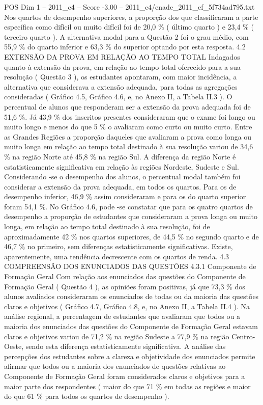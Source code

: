 \begin{textsample}{POS Dim 1 – 2011\_c4 – Score -3.00 – 2011\_c4/enade\_2011\_ef\_5f734ad795.txt}
Nos quartos de desempenho superiores, a proporção dos que classificaram a parte específica como difícil ou muito difícil foi de 20,0 \% ( último quarto ) e 23,4 \% ( terceiro quarto ).
A alternativa modal para a Questão 2 foi o grau médio, com 55,9 \% do quarto inferior e 63,3 \% do superior optando por esta resposta. 4.2 EXTENSÃO DA PROVA EM RELAÇÃO AO TEMPO TOTAL Indagados quanto à extensão da prova, em relação ao tempo total oferecido para a sua resolução ( Questão 3 ), os estudantes apontaram, com maior incidência, a alternativa que considerava a extensão adequada, para todas as agregações consideradas ( Gráfico 4.5, Gráfico 4.6, e, no Anexo II, a Tabela II.3 ).
O percentual de alunos que responderam ser a extensão da prova adequada foi de 51,6 \%.
Já 43,9 \% dos inscritos presentes consideraram que o exame foi longo ou muito longo e menos do que 5 \% o avaliaram como curto ou muito curto.
Entre as Grandes Regiões a proporção daqueles que avaliaram a prova como longa ou muito longa em relação ao tempo total destinado à sua resolução variou de 34,6 \% na região Norte até 45,8 \% na região Sul.
A diferença da região Norte é estatisticamente significativa em relação às regiões Nordeste, Sudeste e Sul.
Considerando -se o desempenho dos alunos, o percentual modal também foi considerar a extensão da prova adequada, em todos os quartos.
Para os de desempenho inferior, 46,9 \% assim consideraram e para os do quarto superior foram 54,1 \%.
No Gráfico 4.6, pode -se constatar que para os quatro quartos de desempenho a proporção de estudantes que consideraram a prova longa ou muito longa, em relação ao tempo total destinado à sua resolução, foi de aproximadamente 42 \% nos quartos superiores, de 44,5 \% no segundo quarto e de 46,7 \% no primeiro, sem diferenças estatisticamente significativas.
Existe, aparentemente, uma tendência decrescente com os quartos de renda. 4.3 COMPREENSÃO DOS ENUNCIADOS DAS QUESTÕES 4.3.1 Componente de Formação Geral Com relação aos enunciados das questões do Componente de Formação Geral ( Questão 4 ), as opiniões foram positivas, já que 73,3 \% dos alunos avaliados consideraram os enunciados de todas ou da maioria das questões claros e objetivos ( Gráfico 4.7, Gráfico 4.8, e, no Anexo II, a Tabela II.4 ).
Na análise regional, a percentagem de estudantes que avaliaram que todos ou a maioria dos enunciados das questões do Componente de Formação Geral estavam claros e objetivos variou de 71,2 \% na região Sudeste a 77,9 \% na região Centro-Oeste, sendo esta diferença estatisticamente significativa.
A análise das percepções dos estudantes sobre a clareza e objetividade dos enunciados permite afirmar que todos ou a maioria dos enunciados de questões relativas ao Componente de Formação Geral foram considerados claros e objetivos para a maior parte dos respondentes ( maior do que 71 \% em todas as regiões e maior do que 61 \% para todos os quartos de desempenho ).

\end{textsample}
